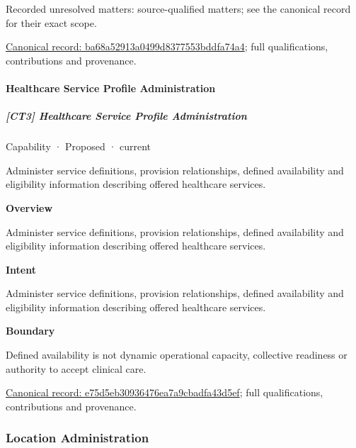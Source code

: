 {\small Recorded unresolved matters: source-qualified matters; see the canonical record for their exact scope.}\par
{\footnotesize \href{../../../../continuum/strategy/capability/ba68a52913a0499d8377553bddfa74a4.md}{Canonical record: ba68a52913a0499d8377553bddfa74a4}; full qualifications, contributions and provenance.}\par
\paragraph{Healthcare Service Profile Administration}

\subparagraph{[CT3] Healthcare Service Profile Administration}

\label{element:e75d5eb30936476ea7a9cbadfa43d5ef}
{\small Capability · Proposed · current}\par

Administer service definitions, provision relationships, defined availability and eligibility information describing offered healthcare services.



\textbf{Overview}



Administer service definitions, provision relationships, defined availability and eligibility information describing offered healthcare services.



\textbf{Intent}



Administer service definitions, provision relationships, defined availability and eligibility information describing offered healthcare services.



\textbf{Boundary}



Defined availability is not dynamic operational capacity, collective readiness or authority to accept clinical care.


{\footnotesize \href{../../../../continuum/strategy/capability/e75d5eb30936476ea7a9cbadfa43d5ef.md}{Canonical record: e75d5eb30936476ea7a9cbadfa43d5ef}; full qualifications, contributions and provenance.}\par
\subsubsection{Location Administration}

